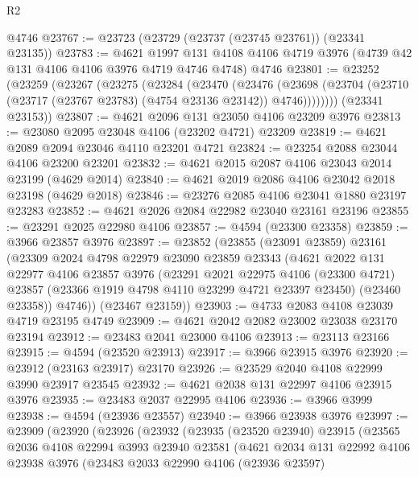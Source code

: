 \begin{lexlean}{R2}
\begin{coremodule}
    @4746
@23767 := @23723 (@23729 (@23737 (@23745 @23761)) (@23341 @23135))
@23783 := @4621
    @1997
    @131
    @4108
    @4106
    @4719
    @3976
    (@4739 @42 @131 @4106 @4106 @3976 @4719 @4746 @4748)
    @4746
@23801 := @23252
    (@23259
      (@23267
        (@23275
          (@23284
            (@23470
              (@23476
                (@23698 (@23704 (@23710 (@23717 (@23767 @23783) (@4754 @23136 @23142)) @4746))))))))
      (@23341 @23153))
@23807 := @4621 @2096 @131 @23050 @4106 @23209 @3976
@23813 := @23080 @2095 @23048 @4106 (@23202 @4721) @23209
@23819 := @4621 @2089 @2094 @23046 @4110 @23201 @4721
@23824 := @23254 @2088 @23044 @4106 @23200 @23201
@23832 := @4621 @2015 @2087 @4106 @23043 @2014 @23199 (@4629 @2014)
@23840 := @4621 @2019 @2086 @4106 @23042 @2018 @23198 (@4629 @2018)
@23846 := @23276 @2085 @4106 @23041 @1880 @23197 @23283
@23852 := @4621 @2026 @2084 @22982 @23040 @23161 @23196
@23855 := @23291 @2025 @22980 @4106
@23857 := @4594 (@23300 @23358)
@23859 := @3966 @23857 @3976
@23897 := @23852
    (@23855
      (@23091 @23859)
      @23161
      (@23309
        @2024
        @4798
        @22979
        @23090
        @23859
        @23343
        (@4621
          @2022
          @131
          @22977
          @4106
          @23857
          @3976
          (@23291
            @2021
            @22975
            @4106
            (@23300 @4721)
            @23857
            (@23366 @1919 @4798 @4110 @23299 @4721 @23397 @23450)
            (@23460 @23358))
          @4746))
      (@23467 @23159))
@23903 := @4733 @2083 @4108 @23039 @4719 @23195 @4749
@23909 := @4621 @2042 @2082 @23002 @23038 @23170 @23194
@23912 := @23483 @2041 @23000 @4106
@23913 := @23113 @23166
@23915 := @4594 (@23520 @23913)
@23917 := @3966 @23915 @3976
@23920 := @23912 (@23163 @23917) @23170
@23926 := @23529 @2040 @4108 @22999 @3990 @23917 @23545
@23932 := @4621 @2038 @131 @22997 @4106 @23915 @3976
@23935 := @23483 @2037 @22995 @4106
@23936 := @3966 @3999
@23938 := @4594 (@23936 @23557)
@23940 := @3966 @23938 @3976
@23997 := @23909
    (@23920
      (@23926
        (@23932
          (@23935
            (@23520 @23940)
            @23915
            (@23565
              @2036
              @4108
              @22994
              @3993
              @23940
              @23581
              (@4621
                @2034
                @131
                @22992
                @4106
                @23938
                @3976
                (@23483
                  @2033
                  @22990
                  @4106
                  (@23936 @23597)

\end{coremodule}
\end{lexlean}
